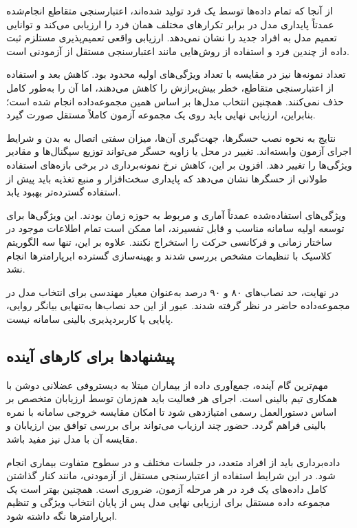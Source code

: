 از آنجا که تمام داده‌ها توسط یک فرد تولید شده‌اند، اعتبارسنجی متقاطع انجام‌شده عمدتاً پایداری مدل در برابر تکرارهای مختلف همان فرد را ارزیابی می‌کند و توانایی تعمیم مدل به افراد جدید را نشان نمی‌دهد. ارزیابی واقعی تعمیم‌پذیری مستلزم ثبت داده از چندین فرد و استفاده از روش‌هایی مانند اعتبارسنجی مستقل از آزمودنی است.

تعداد نمونه‌ها نیز در مقایسه با تعداد ویژگی‌های اولیه محدود بود. کاهش بعد و استفاده از اعتبارسنجی متقاطع، خطر بیش‌برازش را کاهش می‌دهند، اما آن را به‌طور کامل حذف نمی‌کنند. همچنین انتخاب مدل‌ها بر اساس همین مجموعه‌داده انجام شده است؛ بنابراین، ارزیابی نهایی باید روی یک مجموعه آزمون کاملاً مستقل صورت گیرد.

نتایج به نحوه نصب حسگرها، جهت‌گیری آن‌ها، میزان سفتی اتصال به بدن و شرایط اجرای آزمون وابسته‌اند. تغییر در محل یا زاویه حسگر می‌تواند توزیع سیگنال‌ها و مقادیر ویژگی‌ها را تغییر دهد. افزون بر این، کاهش نرخ نمونه‌برداری در برخی بازه‌های استفاده طولانی از حسگرها نشان می‌دهد که پایداری سخت‌افزار و منبع تغذیه باید پیش از استفاده گسترده‌تر بهبود یابد.

ویژگی‌های استفاده‌شده عمدتاً آماری و مربوط به حوزه زمان بودند. این ویژگی‌ها برای توسعه اولیه سامانه مناسب و قابل تفسیرند، اما ممکن است تمام اطلاعات موجود در ساختار زمانی و فرکانسی حرکت را استخراج نکنند. علاوه بر این، تنها سه الگوریتم کلاسیک با تنظیمات مشخص بررسی شدند و بهینه‌سازی گسترده ابرپارامترها انجام نشد.

در نهایت، حد نصاب‌های ۸۰ و ۹۰ درصد به‌عنوان معیار مهندسی برای انتخاب مدل در مجموعه‌داده حاضر در نظر گرفته شدند. عبور از این حد نصاب‌ها به‌تنهایی بیانگر روایی، پایایی یا کاربردپذیری بالینی سامانه نیست.

\subsection{پیشنهادها برای کارهای آینده}

مهم‌ترین گام آینده، جمع‌آوری داده از بیماران مبتلا به دیستروفی عضلانی دوشن با همکاری تیم بالینی است. اجرای هر فعالیت باید هم‌زمان توسط ارزیابان متخصص بر اساس دستورالعمل رسمی  امتیازدهی شود تا امکان مقایسه خروجی سامانه با نمره بالینی فراهم گردد. حضور چند ارزیاب می‌تواند برای بررسی توافق بین ارزیابان و مقایسه آن با مدل نیز مفید باشد.

داده‌برداری باید از افراد متعدد، در جلسات مختلف و در سطوح متفاوت بیماری انجام شود. در این شرایط استفاده از اعتبارسنجی مستقل از آزمودنی، مانند کنار گذاشتن کامل داده‌های یک فرد در هر مرحله آزمون، ضروری است. همچنین بهتر است یک مجموعه داده مستقل برای ارزیابی نهایی مدل پس از پایان انتخاب ویژگی و تنظیم ابرپارامترها نگه داشته شود.

